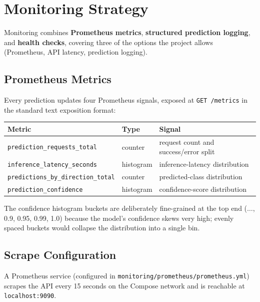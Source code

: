 \documentclass[11pt,a4paper]{article}
\begin{document}
\section{Monitoring Strategy}
\label{sec:monitoring}

Monitoring combines \textbf{Prometheus metrics}, \textbf{structured prediction
logging}, and \textbf{health checks}, covering three of the options the project
allows (Prometheus, API latency, prediction logging).

\subsection{Prometheus Metrics}

Every prediction updates four Prometheus signals, exposed at \texttt{GET
/metrics} in the standard text exposition format:

\begin{table}[H]
\centering
\begin{tabular}{@{}llp{5.5cm}@{}}
\toprule
\textbf{Metric} & \textbf{Type} & \textbf{Signal} \\
\midrule
\texttt{prediction\_requests\_total}       & counter   & request count and success/error split \\
\texttt{inference\_latency\_seconds}        & histogram & inference-latency distribution \\
\texttt{predictions\_by\_direction\_total}  & counter   & predicted-class distribution \\
\texttt{prediction\_confidence}             & histogram & confidence-score distribution \\
\bottomrule
\end{tabular}
\end{table}

The confidence histogram buckets are deliberately fine-grained at the top end
($\ldots$, 0.9, 0.95, 0.99, 1.0) because the model's confidence skews very high;
evenly spaced buckets would collapse the distribution into a single bin.

\subsection{Scrape Configuration}

A Prometheus service (configured in
\texttt{monitoring/prometheus/prometheus.yml}) scrapes the API every 15 seconds
on the Compose network and is reachable at \texttt{localhost:9090}.
\end{document}
